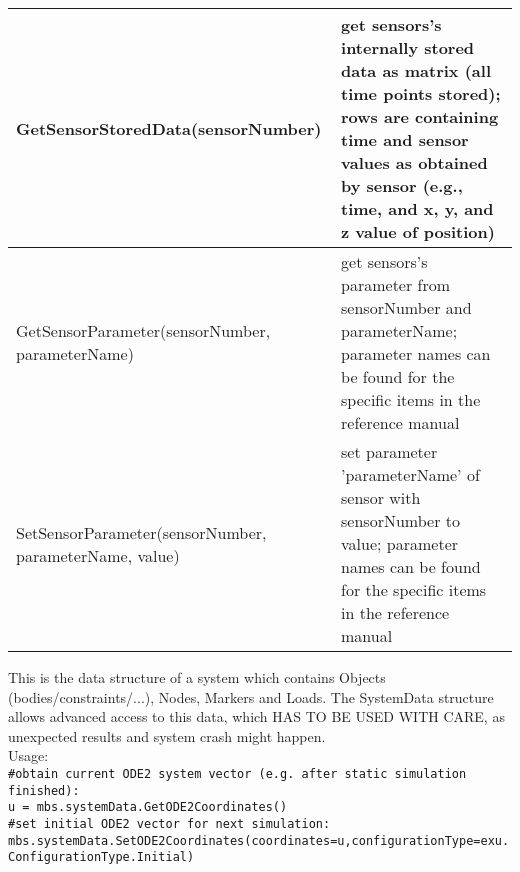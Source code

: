 \begin{center}
\begin{longtable}{| p{8cm} | p{8cm} |}
  GetSensorStoredData(sensorNumber) & get sensors's internally stored data as matrix (all time points stored); rows are containing time and sensor values as obtained by sensor (e.g., time, and x, y, and z value of position)\\ \hline 
  GetSensorParameter(sensorNumber, parameterName) & get sensors's parameter from sensorNumber and parameterName; parameter names can be found for the specific items in the reference manual\\ \hline 
  SetSensorParameter(sensorNumber, parameterName, value) & set parameter 'parameterName' of sensor with sensorNumber to value; parameter names can be found for the specific items in the reference manual\\ \hline 
\end{longtable}
\end{center}

This is the data structure of a system which contains Objects (bodies/constraints/...), Nodes, Markers and Loads. The SystemData structure allows advanced access to this data, which HAS TO BE USED WITH CARE, as unexpected results and system crash might happen. \\ 
 Usage: \\ \small 
\texttt{\#obtain current ODE2 system vector (e.g. after static simulation finished): \\ u = mbs.systemData.GetODE2Coordinates() \\ \#set initial ODE2 vector for next simulation:\\ 
mbs.systemData.SetODE2Coordinates(coordinates=u,configurationType=exu.ConfigurationType.Initial)}


